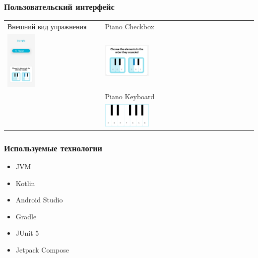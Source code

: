 \documentclass{beamer}
\begin{document}
\begin{frame}
  \frametitle{Пользовательский интерфейс}
  \begin{tabular}{p{5cm} p{7cm}}
  Внешний вид упражнения & Piano Checkbox \\
  \includegraphics[width=0.3\textwidth]{../images/example3-eps-converted-to.pdf}&
  \vspace{-200pt}
  \includegraphics[width=0.3\textwidth]{../images/example1-eps-converted-to.pdf}\\
  &
  \vspace{-140pt}
  Piano Keyboard\\&
  \vspace{-135pt}
  \includegraphics[width=0.3\textwidth]{../images/example4-eps-converted-to.pdf}
 \end{tabular}
\end{frame}

\begin{frame}  
  \frametitle{Используемые технологии}
  \begin{itemize}
    \item JVM
    \item Kotlin
    \item Android Studio
    \item Gradle
    \item JUnit 5
    \item Jetpack Compose
  \end{itemize}   
\end{frame}
\end{document}
